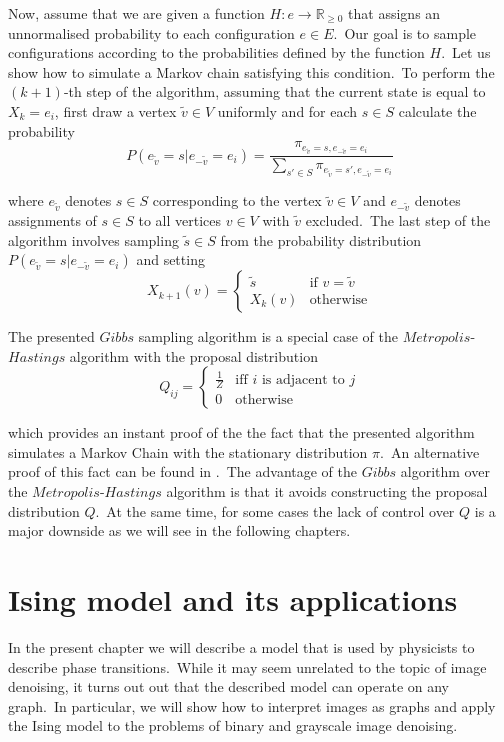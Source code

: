 \documentclass[a4paper, 11pt, onecolumn, openany, titlepage]{report}
\newcommand\numberedchapter[1]{\setlength\topskip{3cm}\chapter{#1}\setlength\topskip{0cm}}
\theoremstyle{default_theorem_style}\newtheorem{theorem}{Theorem}
\theoremstyle{default_theorem_style}\newtheorem{definition}{Definition}
\begin{document}
Now, assume that we are given a function $H : e \to \mathbb R_{\geq 0}$ that assigns an unnormalised probability to
each configuration $e \in E$.\ Our goal is to sample configurations according to the probabilities defined by the
function $H$.\ Let us show how to simulate a Markov chain satisfying this condition.\ To perform the $(k + 1)$-th
step of the algorithm, assuming that the current state is equal to $X_k = e_i$, first draw a vertex $\tilde{v} \in V$
uniformly and for each $s \in S$ calculate the probability
$$
P(e_{\tilde{v}} = s | e_{-\tilde{v}} = e_i) = \frac{\pi_{e_{\tilde{v}} =
s,e_{-\tilde{v}} = e_i}}{\sum_{s' \in S} \pi_{e_{\tilde{v}} = s', e_{-\tilde{v}} = e_i}}
$$

where $e_{\tilde{v}}$ denotes $s \in S$ corresponding to the vertex $\tilde{v} \in V$ and $e_{-\tilde{v}}$
denotes assignments of $s \in S$ to  all vertices $v \in V$ with $\tilde{v}$ excluded.\ The last step of the algorithm
involves sampling $\tilde{s} \in S$ from the probability distribution $P(e_{\tilde{v}} = s | e_{-\tilde{v}} = e_i)$
and setting
$$
X_{k + 1}(v) =
\begin{cases}
  \tilde{s} &\text{if $v = \tilde{v}$}\\
  X_k(v) &\text{otherwise}
\end{cases}
$$

The presented $Gibbs$ sampling algorithm is a special case of the $Metropolis$-$Hastings$ algorithm with the proposal
distribution
$$
Q_{ij} =
\begin{cases}
  \frac{1}{Z} &\text{iff $i$ is adjacent to $j$}\\
  0 &\text{otherwise}
\end{cases}
$$

which provides an instant proof of the the fact that the presented algorithm simulates a Markov Chain with the
stationary distribution $\pi$.\ An alternative proof of this fact can be found in \cite{mcmc_book}.\ The advantage of
the $Gibbs$ algorithm over the $Metropolis$-$Hastings$ algorithm is that it avoids constructing  the proposal
distribution $Q$.\ At the same time, for some cases the lack of control over $Q$ is a major downside as we will see
in the following chapters.

\numberedchapter{Ising model and its applications}

In the present chapter we will describe a model that is used by physicists to describe phase transitions.\ While
it may seem unrelated to the topic of image denoising, it turns out out that the described model can operate on
any graph.\ In particular, we will show how to interpret images as graphs and apply the Ising model to the problems
of binary and grayscale image denoising.
\end{document}

